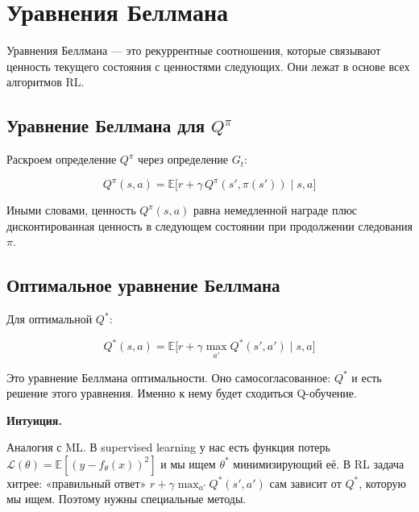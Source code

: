 \documentclass[a4paper, 11pt]{article}
\newenvironment{notebox}{%
  \begin{mdframed}[style=notestyle]
  {\bfseries\color{noteborder}Интуиция.}\quad\ignorespaces
}{%
  \end{mdframed}
}
\newcommand{\E}{\mathbb{E}}
\begin{document}
\section{Уравнения Беллмана}

Уравнения Беллмана — это рекуррентные соотношения, которые связывают
ценность текущего состояния с ценностями следующих. Они лежат в основе
всех алгоритмов RL.

\subsection{Уравнение Беллмана для $Q^\pi$}

Раскроем определение $Q^\pi$ через определение $G_t$:

\begin{equation}
  Q^\pi(s, a) = \E\bigl[r + \gamma\, Q^\pi(s', \pi(s')) \;\big|\; s, a\bigr]
  \label{eq:bellman_policy}
\end{equation}

Иными словами, ценность $Q^\pi(s,a)$ равна немедленной награде плюс
дисконтированная ценность в следующем состоянии при продолжении
следования $\pi$.

\subsection{Оптимальное уравнение Беллмана}

Для оптимальной $Q^*$:

\begin{equation}
  \boxed{Q^*(s, a) = \E\bigl[r + \gamma \max_{a'} Q^*(s', a')
                    \;\big|\; s, a\bigr]}
  \label{eq:bellman_opt}
\end{equation}

Это уравнение Беллмана оптимальности. Оно самосогласованное: $Q^*$ и
есть решение этого уравнения. Именно к нему будет сходиться Q-обучение.

\begin{notebox}
Аналогия с ML. В supervised learning у нас есть функция потерь
$\mathcal{L}(\theta) = \E[(y - f_\theta(x))^2]$ и мы ищем $\theta^*$
минимизирующий её. В RL задача хитрее: «правильный ответ» $r + \gamma
\max_{a'} Q^*(s', a')$ сам зависит от $Q^*$, которую мы ищем.
Поэтому нужны специальные методы.
\end{notebox}
\end{document}
